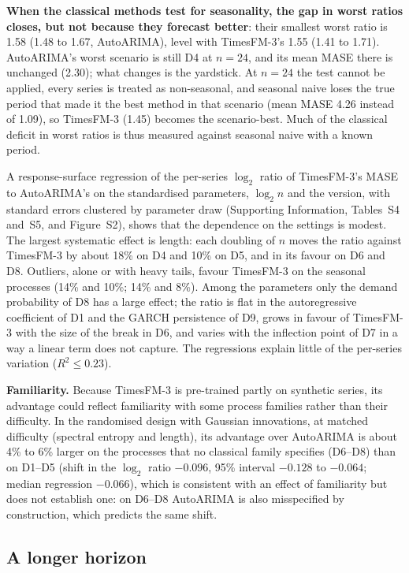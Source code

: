 \documentclass[ASNA]{USG}
\begin{document}
\textbf{When the classical methods test for seasonality, the gap in worst ratios closes, but not because they
forecast better}: their smallest worst ratio is 1.58 (1.48 to 1.67, AutoARIMA), level with TimesFM-3's 1.55
(1.41 to 1.71). AutoARIMA's worst scenario is still D4 at $n = 24$, and its mean MASE there is unchanged (2.30);
what changes is the yardstick. At $n = 24$ the test cannot be applied, every series is treated as
non-seasonal, and seasonal naive loses the true period that made it the best method in that scenario (mean MASE
4.26 instead of 1.09), so TimesFM-3 (1.45) becomes the scenario-best. Much of the classical deficit in worst
ratios is thus measured against seasonal naive with a known period.

A response-surface regression of the per-series $\log_2$ ratio of TimesFM-3's MASE to AutoARIMA's on the
standardised parameters, $\log_2 n$ and the version, with standard errors clustered by parameter draw
(Supporting Information, Tables~S4 and~S5, and Figure~S2), shows that the dependence on the settings is
modest. The largest systematic effect is length: each doubling of $n$ moves the ratio against TimesFM-3 by about 18\% on D4 and 10\% on D5, and in its favour
on D6 and D8. Outliers, alone or with heavy tails, favour TimesFM-3 on the seasonal processes (14\% and 10\%;
14\% and 8\%). Among the
parameters only the demand probability of D8 has a large effect; the ratio is flat in the autoregressive
coefficient of D1 and the GARCH persistence of D9, grows in favour of TimesFM-3 with the size of the break in
D6, and varies with the inflection point of D7 in a way a linear term does not capture. The regressions
explain little of the per-series variation ($R^2 \leq 0.23$).

\textbf{Familiarity.} Because TimesFM-3 is pre-trained partly on synthetic series, its advantage could
reflect familiarity with some process families rather than their difficulty. In the randomised design with
Gaussian innovations, at matched difficulty (spectral entropy and length), its advantage over AutoARIMA is
about 4\% to 6\% larger on the processes
that no classical family specifies (D6--D8) than on D1--D5 (shift in the $\log_2$ ratio $-0.096$, 95\%
interval $-0.128$ to $-0.064$; median regression $-0.066$), which is consistent with an effect of familiarity but does not establish one: on D6--D8 AutoARIMA is also
misspecified by construction, which predicts the same shift.

\subsection{A longer horizon}
\label{sec:horizon48}
\end{document}
